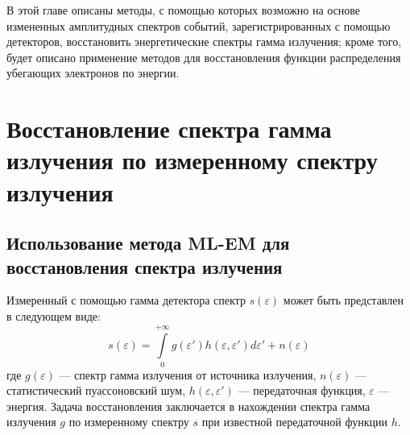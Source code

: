 В этой главе описаны методы, с помощью которых возможно на основе измененных амплитудных спектров событий, зарегистрированных с помощью детекторов, восстановить энергетические спектры гамма излучения; кроме того, будет описано применение методов для восстановления функции распределения убегающих электронов по энергии.


\section{ Восстановление спектра гамма излучения по измеренному спектру излучения }


\subsection{ Использование метода ML-EM для восстановления спектра излучения }

Измеренный с помощью гамма детектора спектр $s(\varepsilon)$ может быть представлен в следующем виде:
\begin{equation}
  \label{eq:BaseConvolution}
  s(\varepsilon) = \int \limits_0^{+\infty} g( \varepsilon' ) h( \varepsilon, \varepsilon' ) d \varepsilon' + n(\varepsilon)
\end{equation}
где $g(\varepsilon)$ --- спектр гамма излучения от источника излучения, $n(\varepsilon)$ --- статистический пуассоновский шум, $ h( \varepsilon, \varepsilon' ) $ --- передаточная функция, $\varepsilon$ --- энергия. Задача восстановления заключается в нахождении спектра гамма излучения $g$ по измеренному спектру $s$ при известной передаточной функции $h$.~\cite{Khilkevitch2013}

